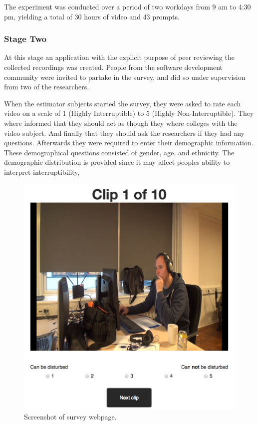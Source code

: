 \documentclass{sigchi}
\begin{document}
The experiment was conducted over a period of two workdays from 9 am to 4:30 pm, yielding a total of 30 hours of video and 43 prompts.

\subsubsection{Stage Two}
\label{sec:stage_two}
At this stage an application with the explicit purpose of peer reviewing the collected recordings was created.
People from the software development community were invited to partake in the survey, and did so under supervision from two of the researchers.

When the estimator subjects started the survey, they were asked to rate each video on a scale of 1 (Highly Interruptible) to 5 (Highly Non-Interruptible).
They where informed that they should act as though they where colleges with the video subject.
And finally that they should ask the researchers if they had any questions.
Afterwards they were required to enter their demographic information.
These demographical questions consisted of gender, age, and ethnicity.
The demographic distribution is provided since it may affect peoples ability to interpret interruptibility,

\begin{figure}
  \centering
  \includegraphics[width=\columnwidth]{figures/webpage_screenshot.png}
  \caption{Screenshot of survey webpage.}
  \label{fig:webpage}
\end{figure}
\end{document}
